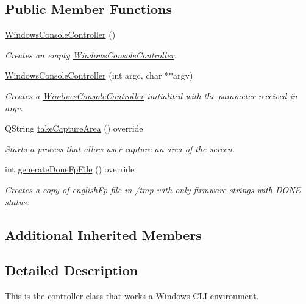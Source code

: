 \subsection*{Public Member Functions}
\begin{DoxyCompactItemize}
\item 
\mbox{\label{classWindowsConsoleController_ac2d015316b132fb43289d44277b33e3b}} 
\mbox{\hyperlink{classWindowsConsoleController_ac2d015316b132fb43289d44277b33e3b}{Windows\+Console\+Controller}} ()
\begin{DoxyCompactList}\small\item\em Creates an empty \mbox{\hyperlink{classWindowsConsoleController}{Windows\+Console\+Controller}}. \end{DoxyCompactList}\item 
\mbox{\hyperlink{classWindowsConsoleController_a684161508236414615ee30bc9b29b79f}{Windows\+Console\+Controller}} (int argc, char $\ast$$\ast$argv)
\begin{DoxyCompactList}\small\item\em Creates a \mbox{\hyperlink{classWindowsConsoleController}{Windows\+Console\+Controller}} initialited with the parameter received in argv. \end{DoxyCompactList}\item 
Q\+String \mbox{\hyperlink{classWindowsConsoleController_ab536d94896c62a1920a6dbfd4b83c18b}{take\+Capture\+Area}} () override
\begin{DoxyCompactList}\small\item\em Starts a process that allow user capture an area of the screen. \end{DoxyCompactList}\item 
int \mbox{\hyperlink{classWindowsConsoleController_afca6af922fe103845177580d6af4859e}{generate\+Done\+Fp\+File}} () override
\begin{DoxyCompactList}\small\item\em Creates a copy of english\+Fp file in /tmp with only firmware strings with D\+O\+NE status. \end{DoxyCompactList}\end{DoxyCompactItemize}
\subsection*{Additional Inherited Members}


\subsection{Detailed Description}
This is the controller class that works a Windows C\+LI environment. 

